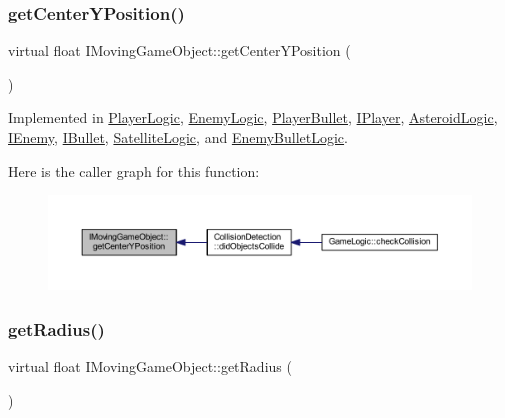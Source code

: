 \subsubsection{\texorpdfstring{get\+Center\+Y\+Position()}{getCenterYPosition()}}
{\footnotesize\ttfamily virtual float I\+Moving\+Game\+Object\+::get\+Center\+Y\+Position (\begin{DoxyParamCaption}{ }\end{DoxyParamCaption})\hspace{0.3cm}{\ttfamily [pure virtual]}}



Implemented in \hyperlink{class_player_logic_ad7b9048aee0c7b58443055f37f871537}{Player\+Logic}, \hyperlink{class_enemy_logic_a8eb47a87a47288783e0c8963c39d24e4}{Enemy\+Logic}, \hyperlink{class_player_bullet_a7ad2bc922595b9a11373fd42666926ef}{Player\+Bullet}, \hyperlink{class_i_player_a6c5a2ec396245f91bee3e00ab089d57e}{I\+Player}, \hyperlink{class_asteroid_logic_a00c9cda893b9dee7e2225377dd54a2eb}{Asteroid\+Logic}, \hyperlink{class_i_enemy_ac9a2d69103fa86d8344aa368fb33c714}{I\+Enemy}, \hyperlink{class_i_bullet_a8245ed2bc72beed1d69547ce5f87a021}{I\+Bullet}, \hyperlink{class_satellite_logic_a416fb2cabc7fcc003cbe04da68dac7c3}{Satellite\+Logic}, and \hyperlink{class_enemy_bullet_logic_a4c006085f2a11f68e8043bca67d3effe}{Enemy\+Bullet\+Logic}.

Here is the caller graph for this function\+:\nopagebreak
\begin{figure}[H]
\begin{center}
\leavevmode
\includegraphics[width=350pt]{class_i_moving_game_object_a075f69d69fd38dc02a0ec3c7b1cb0534_icgraph}
\end{center}
\end{figure}
\mbox{\label{class_i_moving_game_object_ab2120f126d088beda46654aa3ccfd705}} 
\subsubsection{\texorpdfstring{get\+Radius()}{getRadius()}}
{\footnotesize\ttfamily virtual float I\+Moving\+Game\+Object\+::get\+Radius (\begin{DoxyParamCaption}{ }\end{DoxyParamCaption})\hspace{0.3cm}{\ttfamily [pure virtual]}}



